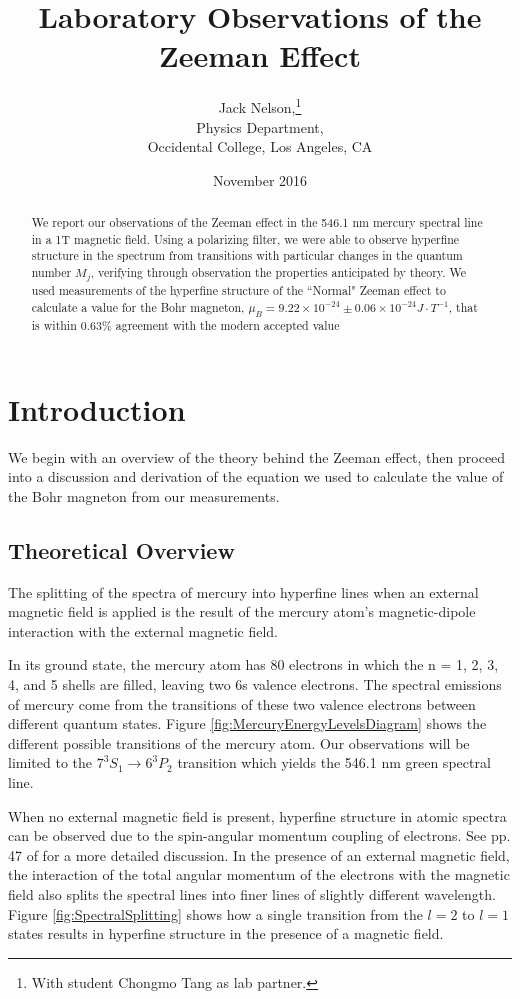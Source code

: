\documentclass[twocolumn]{article}
\title{Laboratory Observations of the Zeeman Effect}
\author{Jack Nelson,\footnote{With student Chongmo Tang as lab partner.}\\
	Physics Department,\\
	Occidental College, Los Angeles, CA}
\date{November 2016}
\begin{document}
\maketitle

\begin{abstract}
	We report our observations of the Zeeman effect in the 546.1 nm mercury spectral line in a 1T magnetic field.
	Using a polarizing filter, we were able to observe hyperfine structure in the spectrum from transitions with particular changes in the quantum number $M_j$, verifying through observation the properties anticipated by theory.
	We used measurements of the hyperfine structure of the ``Normal" Zeeman effect to calculate a value for the Bohr magneton, $\mu_B = 9.22\times10^{-24}\pm 0.06\times10^{-24} J\cdot T^{-1}$, that is within 0.63\% agreement with the modern accepted value
\end{abstract}

\section{Introduction} \label{sec:Intro}
	We begin with an overview of the theory behind the Zeeman effect, then proceed into a discussion and derivation of the equation we used to calculate the value of the Bohr magneton from our measurements.
	
	\subsection{Theoretical Overview} \label{sec:Theory}
		The splitting of the spectra of mercury into hyperfine lines when an external magnetic field is applied is the result of the mercury atom's magnetic-dipole interaction with the external magnetic field.
		 
		In its ground state, the mercury atom has 80 electrons in which the n = 1, 2, 3, 4, and 5 shells are filled, leaving two 6s valence electrons.
		The spectral emissions of mercury come from the transitions of these two valence electrons between different quantum states.
		Figure \ref{fig:MercuryEnergyLevelsDiagram} shows the different possible transitions of the mercury atom.
		Our observations will be limited to the $7^3S_1 \rightarrow 6^3P_2$ transition which yields the 546.1 nm green spectral line.
		
		When no external magnetic field is present, hyperfine structure in atomic spectra can be observed due to the spin-angular momentum coupling of electrons. 
		See pp. 47 of \cite{melissinos_experiments_1966} for a more detailed discussion.
		In the presence of an external magnetic field, the interaction of the total angular momentum of the electrons with the magnetic field also splits the spectral lines into finer lines of slightly different wavelength.
		Figure \ref{fig:SpectralSplitting} shows how a single transition from the $l=2$ to $l=1$ states results in hyperfine structure in the presence of a magnetic field.
		
\end{document}

